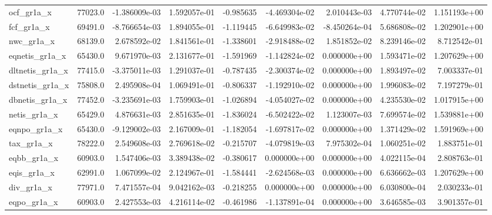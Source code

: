 \documentclass[10pt]{article}
\begin{document}
\begin{landscape}
\begin{longtable}{lrrrrrrrr}
ocf\_gr1a\_x              &   77023.0 & -1.386009e-03 &  1.592057e-01 &     -0.985635 & -4.469304e-02 &  2.010443e-03 &  4.770744e-02 &  1.151193e+00 \\
fcf\_gr1a\_x              &   69491.0 & -8.766654e-03 &  1.894055e-01 &     -1.119445 & -6.649983e-02 & -8.450264e-04 &  5.686808e-02 &  1.202901e+00 \\
nwc\_gr1a\_x              &   68139.0 &  2.678592e-02 &  1.841561e-01 &     -1.338601 & -2.918488e-02 &  1.851852e-02 &  8.239146e-02 &  8.712542e-01 \\
eqnetis\_gr1a\_x          &   65430.0 &  9.671970e-03 &  2.131677e-01 &     -1.591969 & -1.142824e-02 &  0.000000e+00 &  1.593471e-02 &  1.207629e+00 \\
dltnetis\_gr1a\_x         &   77415.0 & -3.375011e-03 &  1.291037e-01 &     -0.787435 & -2.300374e-02 &  0.000000e+00 &  1.893497e-02 &  7.003337e-01 \\
dstnetis\_gr1a\_x         &   75808.0 &  2.495908e-04 &  1.069491e-01 &     -0.806337 & -1.192910e-02 &  0.000000e+00 &  1.996083e-02 &  7.197279e-01 \\
dbnetis\_gr1a\_x          &   77452.0 & -3.235691e-03 &  1.759903e-01 &     -1.026894 & -4.054027e-02 &  0.000000e+00 &  4.235530e-02 &  1.017915e+00 \\
netis\_gr1a\_x            &   65429.0 &  4.876631e-03 &  2.851635e-01 &     -1.836024 & -6.502422e-02 &  1.123007e-03 &  7.699574e-02 &  1.539881e+00 \\
eqnpo\_gr1a\_x            &   65430.0 & -9.129002e-03 &  2.167009e-01 &     -1.182054 & -1.697817e-02 &  0.000000e+00 &  1.371429e-02 &  1.591969e+00 \\
tax\_gr1a\_x              &   78222.0 &  2.549608e-03 &  2.769618e-02 &     -0.215707 & -4.079819e-03 &  7.975302e-04 &  1.060251e-02 &  1.883751e-01 \\
eqbb\_gr1a\_x             &   60903.0 &  1.547406e-03 &  3.389438e-02 &     -0.380617 &  0.000000e+00 &  0.000000e+00 &  4.022115e-04 &  2.808763e-01 \\
eqis\_gr1a\_x             &   62991.0 &  1.067099e-02 &  2.124967e-01 &     -1.584441 & -2.624568e-03 &  0.000000e+00 &  6.636662e-03 &  1.207629e+00 \\
div\_gr1a\_x              &   77971.0 &  7.471557e-04 &  9.042162e-03 &     -0.218255 &  0.000000e+00 &  0.000000e+00 &  6.030800e-04 &  2.030233e-01 \\
eqpo\_gr1a\_x             &   60903.0 &  2.427553e-03 &  4.216114e-02 &     -0.461986 & -1.137891e-04 &  0.000000e+00 &  3.646585e-03 &  3.901357e-01 \\

\end{longtable}
\end{landscape}
\end{document}
